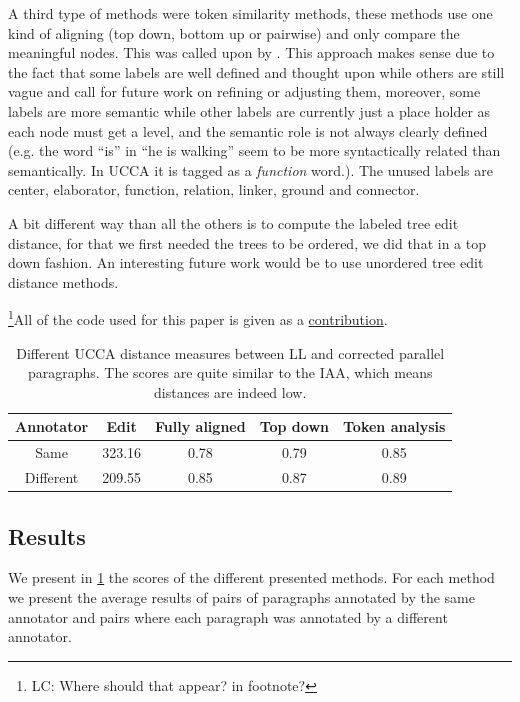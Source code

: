 \documentclass[letter,11pt]{article}
\newcommand{\lc}[1]{\footnote{\color{green}LC: #1}}
\begin{document}
A third type of methods were token similarity methods, these methods
use one kind of aligning (top down, bottom up or pairwise) and only
compare the meaningful nodes. This was called upon by \cite{sulem2015conceptual}. 
This approach makes sense due to the fact that some labels
are well defined and thought upon while others are still vague and
call for future work on refining or adjusting them, moreover, some
labels are more semantic while other labels are currently just a place
holder as each node must get a level, and the semantic role is not
always clearly defined (e.g. the word ``is'' in ``he is walking''
seem to be more syntactically related than semantically. In UCCA it is tagged as a \textit{function} word.). The unused
labels are center, elaborator, function, relation, linker, ground
and connector.

A bit different way than all the others is to compute the labeled
tree edit distance\cite{zhang1989simple}, for that we first needed
the trees to be ordered, we did that in a top down fashion. An interesting
future work would be to use unordered tree edit distance methods\cite{zhang1992editing}.

\lc{Where should that appear? in footnote?}All of the code used for this paper is given as a \href{link will be disclosed upon publication}{contribution}.
\vspace*{-\baselineskip}
\begin{table}[h!]
	\centering
	\singlespacing
	\begin{tabular}{c|c|c|c|c}
		Annotator & Edit & Fully aligned & Top down & Token analysis
		\\
		\hline
		Same & 323.16 & 0.78 & 0.79 & 0.85
		\\
		Different & 209.55 & 0.85 & 0.87 & 0.89
		\\
		\end{tabular}
		\caption{Different UCCA distance measures between LL and corrected parallel paragraphs. The scores are quite similar to the IAA, which means distances are indeed low.\label{tab:Distances}}
	\end{table}
\vspace*{-\baselineskip}
	\subsection{Results}
	
	We present in \ref{tab:Distances} the scores of the different presented
	methods. For each method we present the average results of pairs
	of paragraphs annotated by the same annotator and pairs where each
	paragraph was annotated by a different annotator.
	
\end{document}
